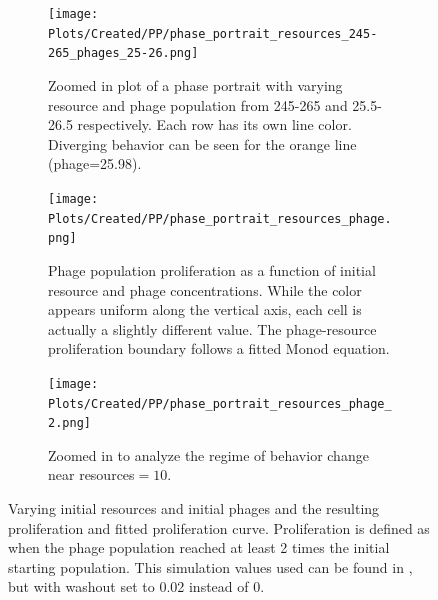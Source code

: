 \begin{figure}[]
    \centering
    \begin{subfigure}{0.49\linewidth}
        \centering
        \texttt{[image: Plots/Created/PP/phase\_portrait\_resources\_245-265\_phages\_25-26.png]}
        \caption{
            Zoomed in plot of a phase portrait with varying resource and phage population from 245-265 and 25.5-26.5 respectively. 
            Each row has its own line color. 
            Diverging behavior can be seen for the orange line (phage=25.98). 
        }
        \label{fig:created:phase_portrait_resources_245-265_phages_25-26}
    \end{subfigure}
    \hfill
    \begin{subfigure}{0.49\linewidth}
        \centering
        \texttt{[image: Plots/Created/PP/phase\_portrait\_resources\_phage.png]}
        \caption{
            Phage population proliferation as a function of initial resource and phage concentrations. 
            While the color appears uniform along the vertical axis, each cell is actually a slightly different value. 
            The phage-resource proliferation boundary follows a fitted Monod equation.
        }
        \label{fig:created:phase_portrait_resources_phage}
    \end{subfigure}
    \hfill
    \begin{subfigure}{0.49\linewidth}
        \centering
        \texttt{[image: Plots/Created/PP/phase\_portrait\_resources\_phage\_2.png]}
        \caption{
            Zoomed in to analyze the regime of behavior change near resources$=10$. 
        }
        \label{fig:created:phase_portrait_resources_phage_2}
    \end{subfigure}
    \caption{
        Varying initial resources and initial phages and the resulting proliferation and fitted proliferation curve. 
        Proliferation is defined as when the phage population reached at least 2 times the initial starting population. 
        This simulation values used can be found in , but with washout set to 0.02 instead of 0. 
    }
    \label{fig:created:phase_portrait_resource_phage_proliferate}
\end{figure}


